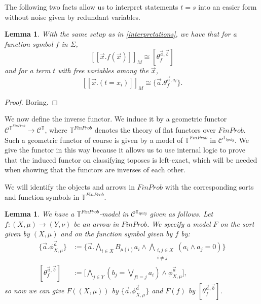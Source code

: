 \documentclass[a4paper]{amsproc}
\theoremstyle{plain}
\newtheorem{lemma}[theorem]{Lemma}
\theoremstyle{definition}
\theoremstyle{remark}
\numberwithin{equation}{section}
\newcommand{\ldoub}{[\![ }
\newcommand{\rdoub}{]\!]}
\begin{document}
The following two facts allow us to interpret statements $t = s$ into an easier form without noise given by redundant variables.

\begin{lemma} With the same setup as in \ref{interpretations}, we have that for a function symbol $f$ in $\Sigma$,
\[
\ldoub \vec{x} . f(\vec{x}) \rdoub_M \cong [ \theta_f^{\vec{a}, \vec{b}} ]
\]
and for a term $t$ with free variables among the $\vec{x}$,
\[
\ldoub \vec{x} . (t=x_i) \rdoub_M \cong \{\vec{a} . \theta_f^{\vec{a},a_i} \} .
\]
\end{lemma}

\begin{proof}
Boring.
\end{proof}

We now define the inverse functor. We induce it by a geometric functor $\mathcal{C}^{\mathbb{T}^{FinProb}} \to \mathcal{C}^{\mathbb{T}}$, where $\mathbb{T}^{FinProb}$ denotes the theory of flat functors over $FinProb$. Such a geometric functor of course is given by a model of $\mathbb{T}^{FinProb}$ in $\mathcal{C}^{\mathbb{T}_{bpalg}}$. We give the functor in this way because it allows us to use internal logic to prove that the induced functor on classifying toposes is left-exact, which will be needed when showing that the functors are inverses of each other.

We will identify the objects and arrows in $FinProb$ with the corresponding sorts and function symbols in $\mathbb{T}^{FinProb}$.

\begin{lemma} \label{inverse}
We have a $\mathbb{T}^{FinProb}$-model in $\mathcal{C}^{\mathbb{T}_{bpalg}}$ given as follows. Let $f: (X,\mu) \to (Y, \nu)$ be an arrow in $FinProb$. We specify a model $F$ on the sort given by $(X,\mu)$ and on the function symbol given by $f$ by:
\begin{align*}
\{\vec{a} . \phi_{X,\mu}^{\vec{a}}\} &:= \Bigg \{ \vec{a} . \bigwedge_{i \in X} B_{\mu(i)} a_i \wedge \bigwedge_{\substack{i,j \in X \\ i \neq j}} (a_i \wedge a_j = 0) \Bigg \} \\
[\theta_f^{\vec{a}, \vec{b}}] &:= \Bigg [ \bigwedge_{j \in Y} (b_j = \bigvee_{f i = j} a_i) \wedge \phi_{X,\mu}^{\vec{a}} \Bigg] ,
\end{align*}
so now we can give $F((X,\mu))$ by $\{\vec{a} . \phi_{X,\mu}^{\vec{a}}\}$ and $F(f)$ by $[\theta_f^{\vec{a}, \vec{b}}]$.
\end{lemma}
\end{document}
